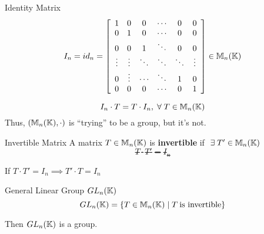 \begin{definition} {Identity Matrix}
    \[
        I_n = id_n = \left[
            \begin{array}{cccccc}
                1      & 0      & 0      & \cdots & 0      & 0      \\
                0      & 1      & 0      & \cdots & 0      & 0      \\
                0      & 0      & 1      & \ddots & 0      & 0      \\
                \vdots & \vdots & \ddots & \ddots & \ddots & \vdots \\
                0      & \vdots & \cdots & \ddots & 1      & 0      \\
                0      & 0      & 0      & \cdots & 0      & 1      \\
            \end{array}
            \right] \in \mathbb{M}_n(\mathbb{K})
    \]
\end{definition}

\begin{observe}
    \[
        I_n \cdot T = T \cdot I_n, \forall T \in \bbm_n(\bbk)
    \]
    Thus, \((\mathbb{M}_n(\mathbb{K}), \cdot)\) is ``trying'' to be a group, but it's not.
\end{observe}

\begin{definition} {Invertible Matrix}
    A matrix \(T \in \mathbb{M}_n(\mathbb{K})\) is \textbf{invertible} if \(\exists T' \in \bbm_n(\bbk)\) \st \[T \cdot T' = I_n\]
\end{definition}
\begin{exercise}
    If \(T \cdot T' = I_n \implies T' \cdot T = I_n\)
\end{exercise}

\begin{definition} {General Linear Group \(GL_n(\mathbb{K})\)}
    \[GL_n(\mathbb{K}) = \{T\in \mathbb{M}_n(\mathbb{K}) \mid T \:\text{is invertible}\}\]
\end{definition}

\begin{remark}
    Then \(GL_n(\mathbb{K})\) is a group.
\end{remark}

